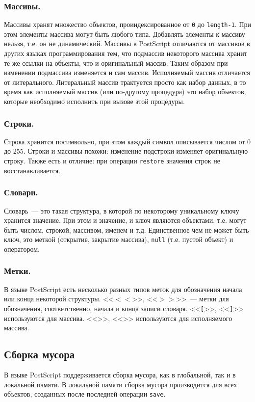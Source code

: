 \subsubsection*{Массивы.}
Массивы хранят множество объектов, проиндексированное от \texttt{0} до \texttt{length-1}. При этом элементы массива могут быть любого типа. Добавлять элементы к массиву нельзя, т.е. он не динамический. Массивы в PostScript отличаются от массивов в других языках программирования тем, что подмассив некоторого массива хранит те же ссылки на объекты, что и оригинальный массив. Таким образом при изменении подмассива изменяется и сам массив. Исполняемый массив отличается от литерального.  Литеральный массив трактуется просто как набор данных, в то время как исполняемый массив (или по-другому процедура) это набор объектов, которые необходимо исполнить при вызове этой процедуры.

\subsubsection*{Строки.}
Строка хранится посимвольно, при этом каждый символ описывается числом от 0 до 255. Строки и массивы похожи: изменение подстроки изменяет оригинальную строку. Также есть и отличие: при операции \texttt{restore} значения строк не восстанавливается.

\subsubsection*{Словари.}
Словарь~--- это такая структура, в которой по некоторому уникальному ключу хранится значение. При этом и значение, и ключ являются объектами, т.е. могут быть числом, строкой, массивом, именем и т.д. Единственное чем не может быть ключ, это меткой (открытие, закрытие массива), \texttt{null} (т.е. пустой объект) и оператором.

\subsubsection*{Метки.}
В языке PostScript есть несколько разных типов меток для обозначения начала или конца некоторой структуры. <<$<<$>>, <<$>>$>>~--- метки для обозначения, соответственно, начала и конца записи словаря. <<\texttt{[}>>, <<\texttt{]}>> используются для массива. <<\texttt{\textbraceleft}>>, <<\texttt{\textbraceright}>> используются для исполняемого массива.
\subsection{Сборка мусора}
В языке PostScript поддерживается сборка мусора, как в глобальной, так и в локальной памяти. В локальной памяти сборка мусора производится для всех объектов, созданных после последней операции \texttt{save}.

